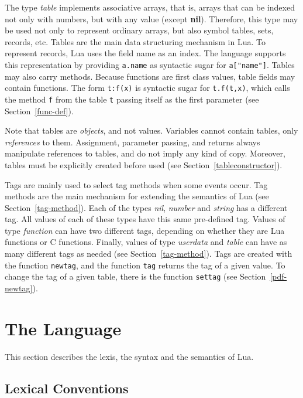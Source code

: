 \documentclass[11pt]{article}
\newcommand{\See}[1]{Section~\ref{#1}}
\newcommand{\see}[1]{(see \See{#1})}
\newcommand{\M}[1]{\emph{#1}}
\newcommand{\nil}{{\bf nil}}
\newcommand{\Index}[1]{#1\index{#1}}
\begin{document}
The type \emph{table} implements \Index{associative arrays},
that is, \Index{arrays} that can be indexed not only with numbers,
but with any value (except \nil).
Therefore, this type may be used not only to represent ordinary arrays,
but also symbol tables, sets, records, etc.
Tables are the main data structuring mechanism in Lua.
To represent \Index{records}, Lua uses the field name as an index.
The language supports this representation by
providing \verb|a.name| as syntactic sugar for \verb|a["name"]|.
Tables may also carry methods.
Because functions are first class values,
table fields may contain functions.
The form \verb|t:f(x)| is syntactic sugar for \verb|t.f(t,x)|,
which calls the method \verb|f| from the table \verb|t| passing
itself as the first parameter \see{func-def}.

Note that tables are \emph{objects}, and not values.
Variables cannot contain tables, only \emph{references} to them.
Assignment, parameter passing, and returns always manipulate references
to tables, and do not imply any kind of copy.
Moreover, tables must be explicitly created before used
\see{tableconstructor}.

Tags are mainly used to select tag methods when
some events occur.
Tag methods are the main mechanism for extending the
semantics of Lua \see{tag-method}.
Each of the types \M{nil}, \M{number} and \M{string} has a different tag.
All values of each of these types have this same pre-defined tag.
Values of type \M{function} can have two different tags,
depending on whether they are Lua functions or C functions.
Finally,
values of type \M{userdata} and \M{table} can have
as many different tags as needed \see{tag-method}.
Tags are created with the function \verb|newtag|,
and the function \verb|tag| returns the tag of a given value.
To change the tag of a given table,
there is the function \verb|settag| \see{pdf-newtag}.


\section{The Language}

This section describes the lexis, the syntax and the semantics of Lua.


\subsection{Lexical Conventions} \label{lexical}
\end{document}
